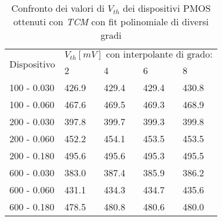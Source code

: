 \begin{table}[t]
  \renewcommand{\arraystretch}{1.3}
  \centering
  \begin{tabular}{m{2.1cm} m{2cm} m{2cm} m{2cm} m{2cm}}
    \toprule
    \multirow{2}{*}{Dispositivo} & \multicolumn{4}{c}{$V_{th} [mV] \text{ con interpolante di grado:}$}                         \\
    \cmidrule{2-5}
                                 & 2                                                                    & 4     & 6     & 8     \\
    \midrule
    100 - 0.030                  & 426.9                                                                & 429.4 & 429.4 & 430.8 \\
    \hline
    100 - 0.060                  & 467.6                                                                & 469.5 & 469.3 & 468.9 \\
    \hline
    200 - 0.030                  & 397.8                                                                & 399.7 & 399.3 & 399.8 \\
    \hline
    200 - 0.060                  & 452.2                                                                & 454.1 & 453.5 & 453.5 \\
    \hline
    200 - 0.180                  & 495.6                                                                & 495.6 & 495.3 & 495.5 \\
    \hline
    600 - 0.030                  & 383.0                                                                & 387.4 & 385.9 & 386.2 \\
    \hline
    600 - 0.060                  & 431.1                                                                & 434.3 & 434.7 & 435.6 \\
    \hline
    600 - 0.180                  & 478.5                                                                & 480.8 & 480.6 & 480.0 \\

    \bottomrule
  \end{tabular}
  \caption[Confronto $V_{th}$ al variare del grado del fit polinomiale con il metodo TCM]{Confronto dei valori di $V_{th}$ dei dispositivi PMOS ottenuti con \emph{TCM} con fit polinomiale di diversi gradi}
  \label{tab:GradiTCM}
\end{table}

